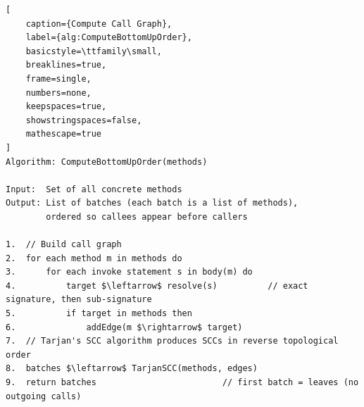 \begin{lstlisting}[
    caption={Compute Call Graph}, 
    label={alg:ComputeBottomUpOrder},
    basicstyle=\ttfamily\small,
    breaklines=true,
    frame=single,
    numbers=none,
    keepspaces=true,
    showstringspaces=false,
    mathescape=true
]
Algorithm: ComputeBottomUpOrder(methods)

Input:  Set of all concrete methods
Output: List of batches (each batch is a list of methods),
        ordered so callees appear before callers

1.  // Build call graph
2.  for each method m in methods do
3.      for each invoke statement s in body(m) do
4.          target $\leftarrow$ resolve(s)          // exact signature, then sub-signature
5.          if target in methods then
6.              addEdge(m $\rightarrow$ target)
7.  // Tarjan's SCC algorithm produces SCCs in reverse topological order
8.  batches $\leftarrow$ TarjanSCC(methods, edges)
9.  return batches                         // first batch = leaves (no outgoing calls)
\end{lstlisting}


